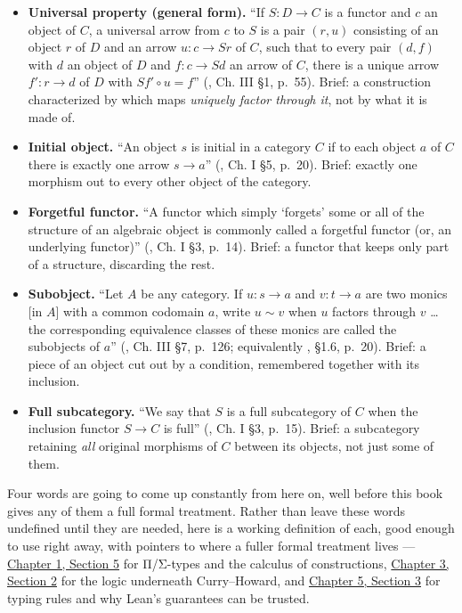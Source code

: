 \begin{itemize}
\item
  \textbf{Universal property (general form).} ``If \(S : D \to C\) is a functor and \(c\) an object of \(C\), a universal arrow from \(c\) to \(S\) is a pair \((r, u)\) consisting of an object \(r\) of \(D\) and an arrow \(u : c \to Sr\) of \(C\), such that to every pair \((d, f)\) with \(d\) an object of \(D\) and \(f : c \to Sd\) an arrow of \(C\), there is a unique arrow \(f' : r \to d\) of \(D\) with \(Sf' \circ u = f\)'' (\cite{MacLane1998}, Ch. III §1, p.~55). Brief: a construction characterized by which maps \emph{uniquely factor through it}, not by what it is made of.
\item
  \textbf{Initial object.} ``An object \(s\) is initial in a category \(C\) if to each object \(a\) of \(C\) there is exactly one arrow \(s \to a\)'' (\cite{MacLane1998}, Ch. I §5, p.~20). Brief: exactly one morphism out to every other object of the category.
\item
  \textbf{Forgetful functor.} ``A functor which simply `forgets' some or all of the structure of an algebraic object is commonly called a forgetful functor (or, an underlying functor)'' (\cite{MacLane1998}, Ch. I §3, p.~14). Brief: a functor that keeps only part of a structure, discarding the rest.
\item
  \textbf{Subobject.} ``Let \(A\) be any category. If \(u : s \to a\) and \(v : t \to a\) are two monics {[}in \(A\){]} with a common codomain \(a\), write \(u \sim v\) when \(u\) factors through \(v\) \ldots{} the corresponding equivalence classes of these monics are called the subobjects of \(a\)'' (\cite{MacLane1998}, Ch. III §7, p.~126; equivalently \cite{Pareigis1970}, §1.6, p.~20). Brief: a piece of an object cut out by a condition, remembered together with its inclusion.
\item
  \textbf{Full subcategory.} ``We say that \(S\) is a full subcategory of \(C\) when the inclusion functor \(S \to C\) is full'' (\cite{MacLane1998}, Ch. I §3, p.~15). Brief: a subcategory retaining \emph{all} original morphisms of \(C\) between its objects, not just some of them.
\end{itemize}

Four words are going to come up constantly from here on, well before this book gives any of them a full formal treatment. Rather than leave these words undefined until they are needed, here is a working definition of each, good enough to use right away, with pointers to where a fuller formal treatment lives --- \hyperref[sec:01-basics:05-pi-sigma-and-coc:1]{Chapter 1, Section 5} for Π/Σ-types and the calculus of constructions, \hyperref[sec:03-propositions-and-proofs:02-logic-recap:1]{Chapter 3, Section 2} for the logic underneath Curry--Howard, and \hyperref[sec:05-rigor-check:03-typing-rules-and-safety:1]{Chapter 5, Section 3} for typing rules and why Lean's guarantees can be trusted.

